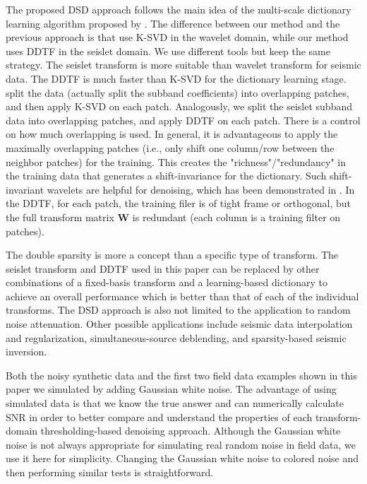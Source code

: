 The proposed DSD approach follows the main idea of the multi-scale dictionary learning algorithm proposed by \cite{ophir2011}. The difference between our method and the previous approach is that \cite{ophir2011} use K-SVD in the wavelet domain, while our method uses DDTF in the seislet domain. We use different tools but keep the same strategy. The seislet transform is more suitable than wavelet transform for seismic data. The DDTF is much faster than K-SVD for the dictionary learning stage. \cite{ophir2011} split the data (actually split the subband coefficients) into overlapping patches, and then apply K-SVD on each patch. Analogously, we split the seislet subband data into overlapping patches, and apply DDTF on each patch. There is a control on how much overlapping is used. In general, it is advantageous to apply the maximally overlapping patches (i.e., only shift one column/row between the neighbor patches) for the training. This creates the "richness"/"redundancy" in the training data that generates a shift-invariance for the dictionary. Such shift-invariant wavelets are helpful for denoising, which has been demonstrated in \cite{donoho19951}. In the DDTF, for each patch, the training filer is of tight frame or orthogonal, but the full transform matrix $\mathbf{W}$  is redundant (each column is a training filter on patches).

The double sparsity is more a concept than a specific type of transform. The seislet transform and DDTF used in this paper can be
replaced by other combinations of a fixed-basis transform and a learning-based dictionary to achieve an overall performance which is better than that of each of the
individual transforms. The DSD approach is also not limited to the application to random noise attenuation. Other possible applications include seismic data
interpolation and regularization, simultaneous-source deblending, and sparsity-based seismic inversion.

Both the noisy synthetic data and the first two field data examples shown in this paper we simulated by adding Gaussian white noise. The advantage of using simulated data is that we know the true answer and can numerically calculate SNR in order to better compare and understand the properties of each transform-domain thresholding-based denoising approach. Although the Gaussian white noise is not always appropriate for simulating real random noise in field data, we use it here for simplicity. Changing the Gaussian white noise to colored noise and then performing similar tests is straightforward. 

